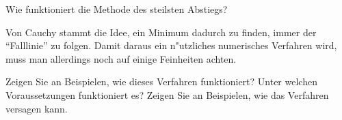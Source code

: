 \begin{aufgabe}
Wie funktioniert die Methode des steilsten Abstiegs?
\end{aufgabe}

{\parindent 0pt Von Cauchy stammt }
die Idee, ein Minimum dadurch zu finden, immer der ``Falllinie'' zu folgen.
Damit daraus ein n"utzliches numerisches Verfahren wird, muss man allerdings
noch auf einige Feinheiten achten.

Zeigen Sie an Beispielen, wie dieses Verfahren funktioniert? Unter
welchen Voraussetzungen funktioniert es? Zeigen Sie an Beispielen,
wie das Verfahren versagen kann.
